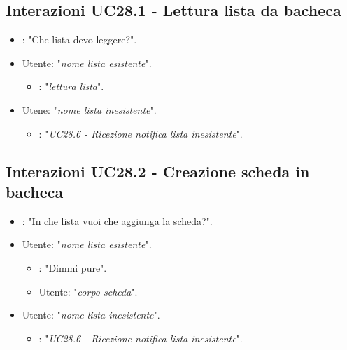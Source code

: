 \subsection{Interazioni UC28.1 - Lettura lista da bacheca }
\label{sec:connettore_trello_leggi_bacheca}
 \begin{itemize}
        \item {}: "Che lista devo leggere?".
        \item Utente: "{\it nome lista esistente}".
        \begin{itemize}
        \item {}: "{\it lettura lista}".
           \end{itemize}
        \item Utene: "{\it nome lista inesistente}".
           \begin{itemize}
        \item {}: "{\it UC28.6 - Ricezione notifica lista inesistente}".
           \end{itemize}
    \end{itemize}


\subsection{Interazioni UC28.2 - Creazione scheda in bacheca }
\label{sec:connettore_trello_crea_bacheca}
 \begin{itemize}
        \item {}: "In che lista vuoi che aggiunga la scheda?".
        \item Utente: "{\it nome lista esistente}".
        \begin{itemize}
        \item {}: "Dimmi pure".
        \item Utente: "{\it corpo scheda}".
           \end{itemize}
        \item Utente: "{\it nome lista inesistente}".
           \begin{itemize}
        \item {}: "{\it UC28.6 - Ricezione notifica lista inesistente}".
           \end{itemize}
    \end{itemize}


